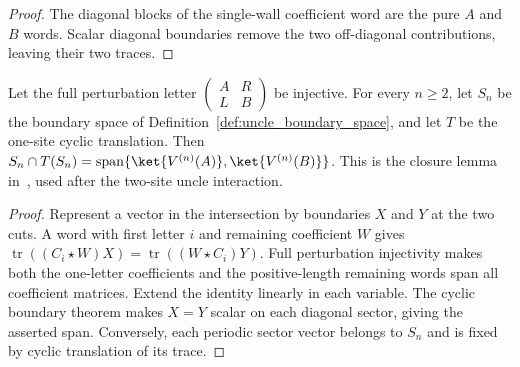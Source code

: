 \begin{proof}
    \leanok
    The diagonal blocks of the single-wall coefficient word are the
    pure $A$ and $B$ words. Scalar diagonal boundaries remove the two
    off-diagonal contributions, leaving their two traces.
\end{proof}

\begin{lemma}
    \label{thm:uncle_periodic_boundary_closure}
    \leanok
    Let the full perturbation letter
    $\left(\begin{smallmatrix}A&R\\L&B\end{smallmatrix}\right)$ be
    injective. For every $n\ge2$, let $S_n$ be the boundary space of
    Definition~\ref{def:uncle_boundary_space}, and let $T$
    be the one-site cyclic translation. Then
    $S_n\cap T(S_n)=\operatorname{span}\{\ket{V^{(n)}(A)},\ket{V^{(n)}(B)}\}$.
    This is the closure lemma in~\cite{FernandezGonzalez2015Uncle},
    used after the two-site uncle interaction.
\end{lemma}

\begin{proof}
    \leanok
    Represent a vector in the intersection by boundaries $X$ and $Y$
    at the two cuts. A word with first letter $i$ and remaining
    coefficient $W$ gives
    $\operatorname{tr}((C_i\star W)X)
        =\operatorname{tr}((W\star C_i)Y)$.
    Full perturbation injectivity makes both the one-letter
    coefficients and the positive-length remaining words span all
    coefficient matrices. Extend the identity linearly in each
    variable. The cyclic boundary theorem makes $X=Y$ scalar on
    each diagonal sector, giving the asserted span. Conversely,
    each periodic sector vector belongs to $S_n$ and is fixed by
    cyclic translation of its trace.
\end{proof}

